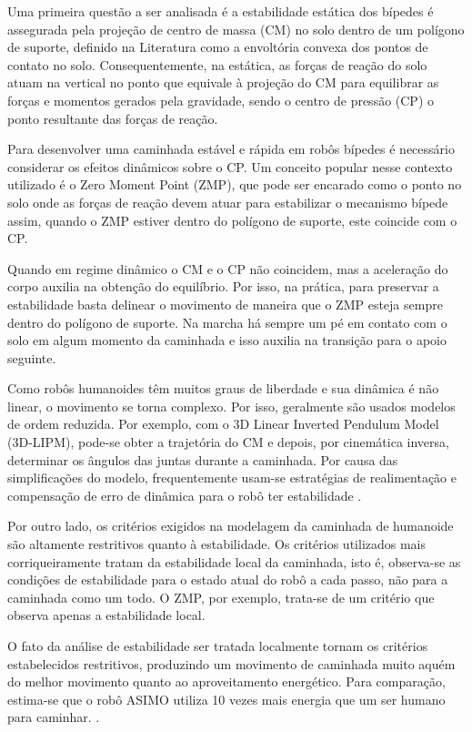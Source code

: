 Uma primeira questão a ser analisada é a estabilidade estática dos bípedes é assegurada pela projeção de centro de massa (CM) no solo dentro de um polígono de suporte, definido na Literatura como a envoltória convexa dos pontos de contato no solo. Consequentemente, na estática, as forças de reação do solo atuam na vertical no ponto que equivale à projeção do CM para equilibrar as forças e momentos gerados pela gravidade, sendo o centro de pressão (CP) o ponto resultante das forças de reação.

Para desenvolver uma caminhada estável e rápida em robôs bípedes é necessário considerar os efeitos dinâmicos sobre o CP. Um conceito popular nesse contexto  utilizado é o Zero Moment Point (ZMP), que pode ser encarado  como o ponto no solo onde as forças de reação devem atuar para estabilizar o mecanismo bípede \cite{vukobratovic2004} assim, quando o ZMP estiver dentro do polígono de suporte, este coincide com o CP.

Quando em regime dinâmico o CM e o CP não coincidem, mas a aceleração do corpo auxilia na obtenção do equilíbrio. Por isso, na prática, para preservar a estabilidade basta delinear o movimento de maneira que o ZMP esteja sempre dentro do polígono de suporte. Na marcha há sempre um pé em contato com o solo em algum momento da caminhada e isso auxilia na transição para o apoio seguinte.

Como robôs humanoides têm muitos graus de liberdade e sua dinâmica é não linear, o movimento se torna complexo. Por isso, geralmente são usados modelos de ordem reduzida.  Por exemplo, com o 3D Linear Inverted Pendulum Model (3D-LIPM)\cite{kajita2001}, pode-se obter a trajetória do CM e depois, por cinemática inversa, determinar os ângulos das juntas durante a caminhada. Por causa das simplificações do modelo, frequentemente usam-se estratégias de realimentação e compensação de erro de dinâmica para o robô ter estabilidade \cite{yoshiike2009}.


Por outro lado, os critérios exigidos na modelagem da caminhada de humanoide são altamente restritivos quanto à estabilidade. Os critérios utilizados mais corriqueiramente tratam da estabilidade local da caminhada, isto é, observa-se as condições de estabilidade para o estado atual do robô a cada passo, não para a caminhada como um todo. O ZMP, por exemplo, trata-se de um critério que observa apenas a estabilidade local.

O fato da análise de estabilidade ser tratada localmente tornam os critérios estabelecidos restritivos, produzindo um movimento de caminhada muito aquém do melhor movimento quanto ao aproveitamento energético. Para comparação, estima-se que o robô ASIMO utiliza 10 vezes mais energia que um ser humano para caminhar. \cite{tedrake2005}.

